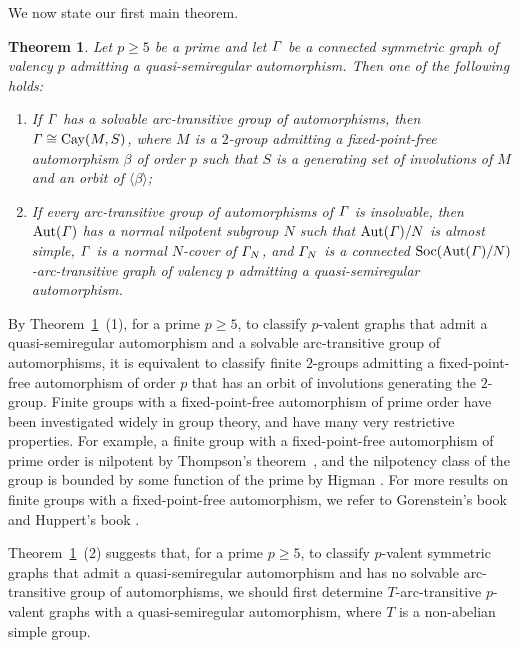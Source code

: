 \documentclass[12pt,reqno]{amsart}
\def\soc{ \mathrm{Soc}}
\numberwithin {equation} {section}
\newtheorem{theorem}{Theorem}[section]
\begin{document}
We now state our first main theorem.

\begin{theorem}\label{th:valp} Let $p\geq 5$ be a prime and let ${\it \Gamma}$ be a connected symmetric graph of valency $p$ admitting a quasi-semiregular automorphism. Then one of the following holds:
\begin{enumerate}[\rm (1)]
 \item  If ${\it \Gamma}$ has a solvable arc-transitive group of automorphisms, then ${\it \Gamma}\cong\mathrm{Cay}(M,S)$, where $M$ is a $2$-group admitting a fixed-point-free automorphism $\beta$ of order $p$ such that $S$ is a generating set of involutions of $M$ and an orbit of $\langle \beta \rangle$;
\item If every arc-transitive group of automorphisms of ${\it \Gamma}$ is insolvable, then $\mathrm{Aut}({\it \Gamma})$ has a normal nilpotent subgroup $N$ such that $\mathrm{Aut}({\it \Gamma})/N$ is almost simple, ${\it \Gamma}$ is a normal $N$-cover of ${\it \Gamma}_N$, and ${\it \Gamma}_N$ is a connected $\soc(\Aut(\Ga)/N)$-arc-transitive graph of valency $p$ admitting a quasi-semiregular automorphism.
\end{enumerate}
\end{theorem}

By Theorem~\ref{th:valp}~(1), for a prime $p\geq 5$, to classify $p$-valent graphs that admit a quasi-semiregular automorphism and a solvable arc-transitive group of automorphisms, it is equivalent to classify finite $2$-groups admitting a fixed-point-free automorphism of order $p$ that has an orbit of involutions generating the $2$-group. Finite groups with a fixed-point-free automorphism of prime order have been investigated widely in group theory, and have many very restrictive properties. For example, a finite group with a fixed-point-free automorphism of prime order is nilpotent by Thompson's theorem~\cite{Thompson1959}, and the nilpotency class of the group is bounded by
some function of the prime by Higman \cite{Higman1957}. For more results on finite groups with a fixed-point-free automorphism, we refer to Gorenstein's book \cite[Chapter 10]{DG} and Huppert's book \cite[Chapter X, \S11]{Huppert82b}. %


Theorem~\ref{th:valp}~(2) suggests that, for a prime $p\geq 5$, to classify $p$-valent symmetric graphs that admit a quasi-semiregular automorphism and has no solvable arc-transitive group of automorphisms, we should first determine $T$-arc-transitive $p$-valent graphs with a quasi-semiregular automorphism, where $T$ is a non-abelian simple group.
\end{document}
